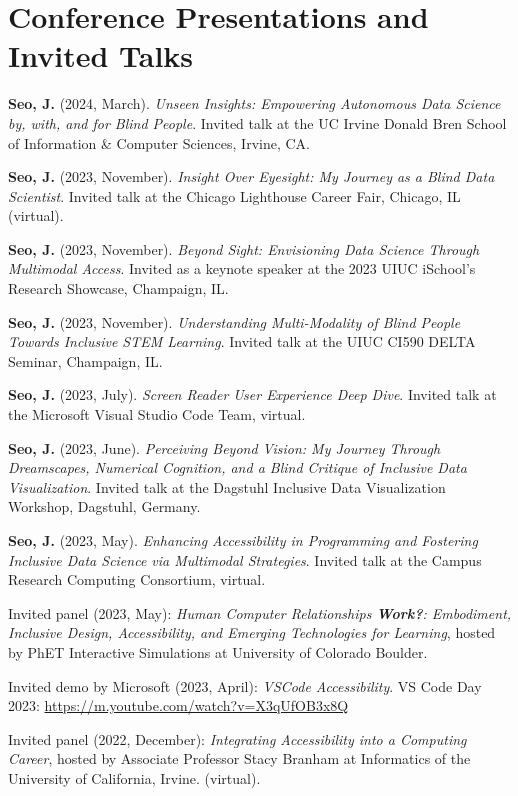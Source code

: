 \documentclass[11pt,a4paper,]{awesome-cv}
\begin{document}
\section{Conference Presentations and Invited
Talks}\label{conference-presentations-and-invited-talks-1}

\textbf{Seo, J.} (2024, March). \emph{Unseen Insights: Empowering
Autonomous Data Science by, with, and for Blind People}. Invited talk at
the UC Irvine Donald Bren School of Information \& Computer Sciences,
Irvine, CA.

\textbf{Seo, J.} (2023, November). \emph{Insight Over Eyesight: My
Journey as a Blind Data Scientist}. Invited talk at the Chicago
Lighthouse Career Fair, Chicago, IL (virtual).

\textbf{Seo, J.} (2023, November). \emph{Beyond Sight: Envisioning Data
Science Through Multimodal Access}. Invited as a keynote speaker at the
2023 UIUC iSchool's Research Showcase, Champaign, IL.

\textbf{Seo, J.} (2023, November). \emph{Understanding Multi-Modality of
Blind People Towards Inclusive STEM Learning}. Invited talk at the UIUC
CI590 DELTA Seminar, Champaign, IL.

\textbf{Seo, J.} (2023, July). \emph{Screen Reader User Experience Deep
Dive}. Invited talk at the Microsoft Visual Studio Code Team, virtual.

\textbf{Seo, J.} (2023, June). \emph{Perceiving Beyond Vision: My
Journey Through Dreamscapes, Numerical Cognition, and a Blind Critique
of Inclusive Data Visualization}. Invited talk at the Dagstuhl Inclusive
Data Visualization Workshop, Dagstuhl, Germany.

\textbf{Seo, J.} (2023, May). \emph{Enhancing Accessibility in
Programming and Fostering Inclusive Data Science via Multimodal
Strategies}. Invited talk at the Campus Research Computing Consortium,
virtual.

Invited panel (2023, May): \emph{Human Computer Relationships
\textbf{Work?}: Embodiment, Inclusive Design, Accessibility, and
Emerging Technologies for Learning}, hosted by PhET Interactive
Simulations at University of Colorado Boulder.

Invited demo by Microsoft (2023, April): \emph{VSCode Accessibility}. VS
Code Day 2023: \url{https://m.youtube.com/watch?v=X3qUfOB3x8Q}

Invited panel (2022, December): \emph{Integrating Accessibility into a
Computing Career}, hosted by Associate Professor Stacy Branham at
Informatics of the University of California, Irvine. (virtual).
\end{document}
